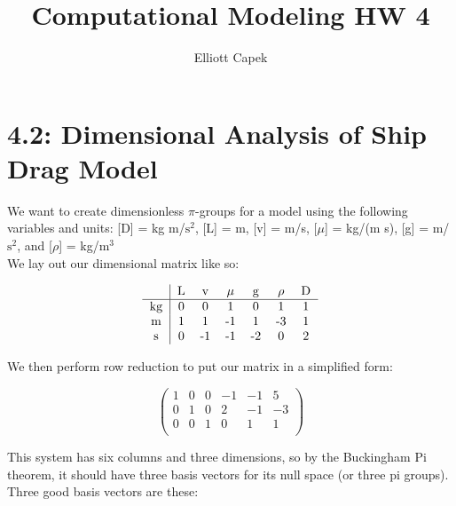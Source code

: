 \documentclass[10pt]{article} %
\title{Computational Modeling HW 4}
\author{Elliott Capek}
\begin{document}
\maketitle{}

\section{4.2: Dimensional Analysis of Ship Drag Model}
We want to create dimensionless $\pi$-groups for a model using the following variables and units: [D] = kg m/$\mbox{s}^2$, [L] = m, [v] = m/s, [$\mu$] = kg/(m s), [g] = m/$\mbox{s}^2$, and [$\rho$] = kg/$\mbox{m}^3$\\

We lay out our dimensional matrix like so:

\begin{equation*}
  \begin{tabular}{c|c c c c c c}
    ~ & L & v & $\mu$ & g & $\rho$ & D\\
    \hline
    kg & 0 &  0 &  1 &  0 &  1 & 1\\
    m  & 1 &  1 & -1 &  1 & -3 & 1 \\
    s  & 0 & -1 & -1 & -2 &  0 & 2 \\
  \end{tabular}
\end{equation*}

We then perform row reduction to put our matrix in a simplified form:

\begin{equation*}
  \begin{pmatrix}
    1 &  0 &  0 & -1 & -1 &  5\\
    0 &  1 &  0 &  2 & -1 & -3\\
    0 &  0 &  1 &  0 &  1 &  1\\
  \end{pmatrix}
\end{equation*}

This system has six columns and three dimensions, so by the Buckingham Pi theorem, it should have three basis vectors for its null space (or three pi groups). Three good basis vectors are these:
\end{document}
